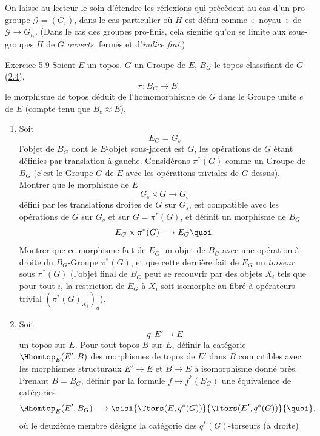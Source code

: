 \documentclass[10pt]{../fichiers-configuration-latex/smfart}
\begin{document}
\subsubsection{}
On laisse au lecteur le soin d'étendre les réflexions qui
précèdent au cas d'un pro-groupe $𝒢=(G_i)$, dans le cas
particulier où $H$ est défini comme « noyau »  de
$𝒢\rightarrow G_{i_{\circ}}$. (Dans le cas des groupes
pro-finis, cela signifie qu'on se limite aux sous-groupes $H$ de $G$
\emph{ouverts}, \ie fermés et d'\emph{indice fini}.)

\begin{enonce*}[remark]{Exercice 5.9}
Soient $E$ un topos, $G$ un Groupe de $E$, $B_G$ le topos
classifiant de $G$ (\hyperref[IV.subsec2.4]{2.4}),
$$
\pi:B_G\longrightarrow E
$$
le morphisme de topos déduit de l'homomorphisme de $G$ dans le
Groupe unité $e$ de $E$ (compte tenu que $B_e\approx E$).
\begin{enumerate}
\renewcommand{\theenumi}{\alph{enumi}}
\renewcommand{\labelenumi}{\theenumi)}
\item Soit
$$
E_G=G_s
$$
l'objet de $B_G$ dont le $E$-objet sous-jacent est $G$, les
opérations de $G$ étant définies par translation à gauche.
Considérons $\pi^{\ast}(G)$ comme un Groupe de $B_G$ (c'est le
Groupe $G$ de $E$ avec les opérations triviales de $G$ dessus).
Montrer que le morphisme de $E$
$$
G_s\times G\longrightarrow G_s
$$
défini par les translations droites de $G$ sur $G_s$, est
compatible avec les opérations de $G$ sur $G_s$ et sur
$G=\pi^{\ast}(G)$, et définit un morphisme de $B_G$
$$
E_G\times \pi^{\ast}(G)\longrightarrow E_G{\quoi}.
$$
Montrer que ce morphisme fait de $E_G$ un objet de $B_G$ avec une
opération à droite du $B_G$-Groupe $\pi^{\ast}(G)$, et que cette
dernière fait de $E_G$ un \emph{torseur} sous\pageoriginale
$\pi^{\ast}(G)$ (\ie l'objet final de $B_G$ peut se recouvrir par
des objets $X_i$ tels que pour tout $i$, la restriction de $E_G$ à
$X_i$ soit isomorphe au fibré à opérateurs trivial
$(\pi^{\ast}(G)_{X_i})_d$).

\item Soit
$$
q:E'\longrightarrow E
$$
un topos sur $E$. Pour tout topos $B$ sur $E$, définir la
catégorie $\Hhomtop_E(E',B)$ des morphismes de topos de $E'$ dans
$B$ compatibles avec les morphismes structuraux $E'\rightarrow E$ et
$B\rightarrow E$ à isomorphisme donné près. Prenant $B=B_G$,
définir par la formule $f\mapsto f^{\ast}(E_G)$ une équivalence
de catégories
$$
\Hhomtop_E(E',B_G)\longrightarrow \sisi{\Ttors(E,q^{\ast}(G))}{\Ttors(E',q^{\ast}(G))}{\quoi},
$$
où le deuxième membre désigne la catégorie des
$q^{\ast}(G)$-torseurs (à droite) 


\end{enumerate}
\end{enonce*}
\end{document}
